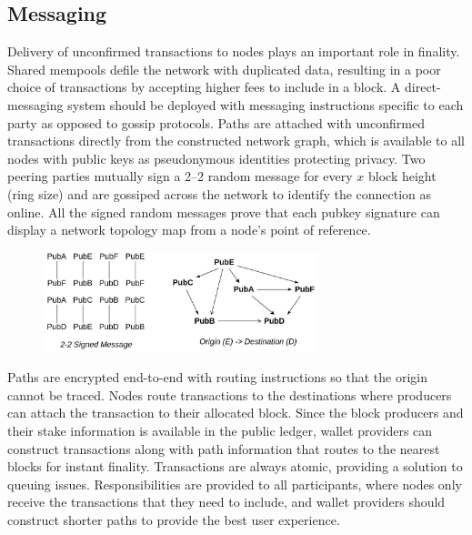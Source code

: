 \documentclass[a4paper, 10pt]{extarticle}
\begin{document}
\subsection{Messaging}
Delivery of unconfirmed transactions to nodes plays an important role in finality. Shared mempools defile the network with duplicated data, resulting in a poor choice of transactions by accepting higher fees to include in a block. A direct-messaging system should be deployed with messaging instructions specific to each party as opposed to gossip protocols. Paths are attached with unconfirmed transactions directly from the constructed network graph, which is available to all nodes with public keys as pseudonymous identities protecting privacy. Two peering parties mutually sign a 2–2 random message for every $x$ block height (ring size) and are gossiped across the network to identify the connection as online. All the signed random messages prove that each pubkey signature can display a network topology map from a node's point of reference.
\begin{figure}[H]
\begin{center}
\includegraphics[width=8cm]{topology}
\end{center}
\end{figure}
Paths are encrypted end-to-end with routing \cite{poon2016bitcoin} instructions so that the origin cannot be traced. Nodes route transactions to the destinations where producers can attach the transaction to their allocated block. Since the block producers and their stake information is available in the public ledger, wallet providers can construct transactions along with path information that routes to the nearest blocks for instant finality. Transactions are always atomic, providing a solution to queuing issues. Responsibilities are provided to all participants, where nodes only receive the transactions that they need to include, and wallet providers should construct shorter paths to provide the best user experience.
\end{document}
